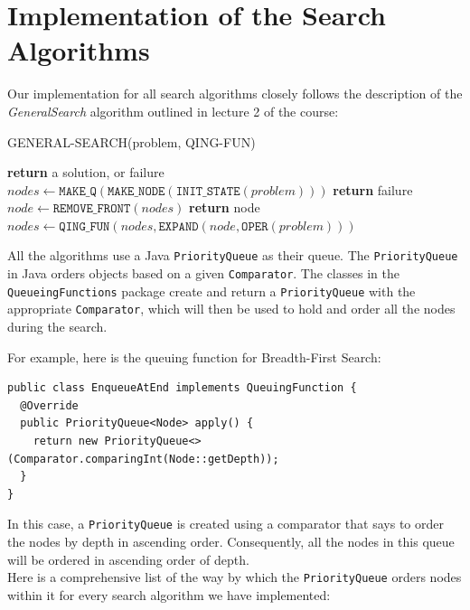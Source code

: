 \documentclass{article}
\begin{document}
\section{Implementation of the Search Algorithms}

Our implementation for all search algorithms closely follows the description of the \textsl{GeneralSearch} algorithm outlined in lecture 2 of the course: 


\begin{algorithm}
\caption{GENERAL-SEARCH(problem, QING-FUN)}
\begin{algorithmic}[1]
    \State \textbf{return} a solution, or failure
    \State $nodes \gets \texttt{MAKE\_Q}(\texttt{MAKE\_NODE}(\texttt{INIT\_STATE}(problem)))$
            \State \textbf{return} failure
        \EndIf
        \State $node \gets \texttt{REMOVE\_FRONT}(nodes)$
            \State \textbf{return} node
        \EndIf
        \State $nodes \gets \texttt{QING\_FUN}(nodes, \texttt{EXPAND}(node, \texttt{OPER}(problem)))$
    \EndWhile
\end{algorithmic}
\end{algorithm}

All the algorithms use a Java \texttt{PriorityQueue} as their queue. The \texttt{PriorityQueue} in Java orders objects based on a given \texttt{Comparator}. The classes in the \texttt{QueueingFunctions} package create and return a \texttt{PriorityQueue} with the appropriate \texttt{Comparator}, which will then be used to hold and order all the nodes during the search. \\

\newpage

For example, here is the queuing function for Breadth-First Search: 

\begin{verbatim}
public class EnqueueAtEnd implements QueuingFunction {
  @Override
  public PriorityQueue<Node> apply() {
    return new PriorityQueue<>(Comparator.comparingInt(Node::getDepth));
  }
}
\end{verbatim}

In this case, a \texttt{PriorityQueue} is created using a comparator that says to order the nodes by depth in ascending order. Consequently, all the nodes in this queue will be ordered in ascending order of depth. \\

Here is a comprehensive list of the way by which the \texttt{PriorityQueue} orders nodes within it for every search algorithm we have implemented:
\end{document}
